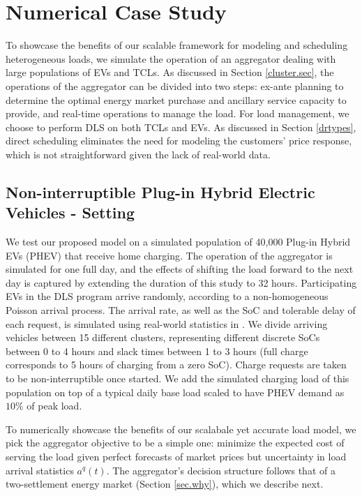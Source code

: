 \documentclass[10pt]{IEEEtran}
\begin{document}
\vspace{-0.2cm}

\section{Numerical Case Study}\label{sec.numerical}
To showcase the benefits of our scalable framework for modeling and scheduling heterogeneous loads, we simulate the operation of an aggregator dealing with large populations of EVs and TCLs. As discussed in Section \ref{cluster.sec}, the operations of the aggregator can be divided into two steps: ex-ante planning to determine the optimal energy market purchase and ancillary service capacity to provide, and real-time operations to manage the load. For load management, we choose to perform DLS on both TCLs and EVs. As discussed in Section \ref{drtypes}, direct scheduling eliminates the need for modeling the customers' price response, which is not straightforward given the lack of real-world data.

\subsection{Non-interruptible Plug-in Hybrid  Electric Vehicles - Setting}
We test our proposed model on a simulated population of 40,000 Plug-in Hybrid EVs (PHEV) that receive home charging. The operation of the aggregator is simulated for one full day, and the effects of shifting the load forward to the next day is captured by extending the duration of this study to 32 hours. Participating EVs in the DLS program arrive randomly, according to a non-homogeneous Poisson arrival process. The arrival rate, as well as the SoC and tolerable delay of each request, is simulated using real-world statistics in \cite{alizadeh2013ev}. We divide arriving vehicles between 15 different clusters,  representing different discrete SoCs between 0 to 4 hours and slack times between 1 to 3 hours (full charge corresponds to 5 hours of charging from a zero SoC).  Charge requests are taken to be non-interruptible once started. We add the simulated charging load of this population on top of a typical daily base load scaled to have PHEV demand as $10\%$ of peak load\cite{data}. 

To numerically showcase the benefits of our scalabale yet accurate load model, we pick the aggregator objective to be a simple one: minimize the expected cost of serving the load given perfect forecasts of market prices but uncertainty in load arrival statistics $a^q(t)$.
The aggregator's decision structure follows that of a two-settlement energy market (Section \ref{sec.why}), which we describe next.
\end{document}
